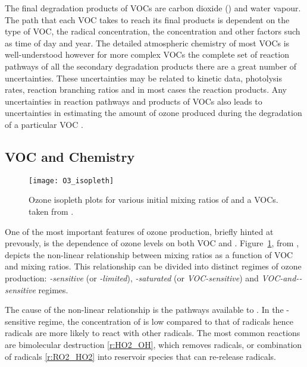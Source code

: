 The final degradation products of VOCs are carbon dioxide () and water vapour. 
The path that each VOC takes to reach its final products is dependent on the type of VOC, the radical concentration, the  concentration and other factors such as time of day and year. 
The detailed atmospheric chemistry of most VOCs is well-understood however for more complex VOCs the complete set of reaction pathways of all the secondary degradation products there are a great number of uncertainties. 
These uncertainties may be related to kinetic data, photolysis rates, reaction branching ratios and in most cases the reaction products.
Any uncertainties in reaction pathways and products of VOCs also leads to uncertainties in estimating the amount of ozone produced during the degradation of a particular VOC \citep{Atkinson:2000}.

\subsection[VOC and NOx Chemistry]{VOC and  Chemistry} \label{ss:VOC&NOx}
\begin{figure}
	\begin{center}
        \caption[Ozone mixing ratios as a function of  and VOC]{Ozone isopleth plots for various initial mixing ratios of  and a VOCs. taken from \citet{Jenkin:2000}.}
        \texttt{[image: O3\_isopleth]}
		\label{f:O3_isopleth}
	\end{center}
\end{figure}
One of the most important features of ozone production, briefly hinted at prevously, is the dependence of ozone levels on both VOC and .
Figure~\ref{f:O3_isopleth}, from \citet{Jenkin:2000}, depicts the non-linear relationship between  mixing ratios as a function of VOC and  mixing ratios.  
This relationship can be divided into distinct regimes of ozone production: \emph{-sensitive} (or \emph{-limited}), \emph{-saturated} (or \emph{VOC-sensitive}) and \emph{VOC-and--sensitive} regimes. 

The cause of the non-linear relationship is the pathways available to .
In the -sensitive regime, the concentration of  is low compared to that of radicals hence radicals are more likely to react with other radicals. 
The most common reactions are bimolecular destruction \eqref{r:HO2_OH}, which removes radicals, or combination of radicals \eqref{r:RO2_HO2} into reservoir species that can re-release radicals.
\begin{rxnarray}
     \rightarrow {} \label{r:HO2_OH}
\end{rxnarray}


